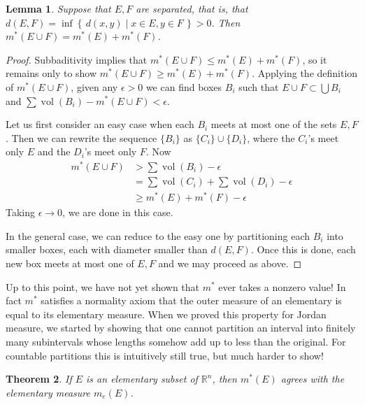 \documentclass[11pt,oneside]{amsbook}
\newcommand{\set}[1]{\left\{\,#1\,\right\}}
\newcommand{\RR}{{\mathbb R}}
\DeclareMathOperator{\vol}{vol}
\theoremstyle{definition}
\theoremstyle{plain}
\newtheorem{thm}{Theorem}[section]
\newtheorem{lem}[thm]{Lemma}
\theoremstyle{definition}
\theoremstyle{remark}
\numberwithin{equation}{section}
\numberwithin{figure}{section}
\begin{document}
\begin{lem}
  Suppose that $E,F$ are separated, that is, that $d(E,F)=\inf\set{d(x,y)\mid x\in E, y\in F}>0$. Then $m^*(E\cup F)=m^*(E)+m^*(F)$.
\end{lem}

\begin{proof}
  Subbaditivity implies that $m^*(E\cup F)\leq m^*(E)+m^*(F)$, so it remains only to show $m^*(E\cup F)\geq m^*(E)+m^*(F)$. Applying the definition of $m^*(E\cup F)$, given any $\epsilon>0$ we can find boxes $B_i$ such that $E\cup F\subset\bigcup B_i$ and $\sum\vol(B_i)-m^*(E\cup F)<\epsilon$.

  Let us first consider an easy case when each $B_i$ meets at most one of the sets $E,F$. Then we can rewrite the sequence $\{B_i\}$ as $\{C_i\}\cup\{D_i\}$, where the $C_i$'s meet only $E$ and the $D_i$'s meet only $F$. Now
  \begin{align*}
    m^*(E\cup F)&>\sum\vol(B_i)-\epsilon\\
                &=\sum\vol(C_i)+\sum\vol(D_i)-\epsilon\\
                &\geq m^*(E)+m^*(F)-\epsilon
  \end{align*}
  Taking $\epsilon\to0$, we are done in this case.

  In the general case, we can reduce to the easy one by partitioning each $B_i$ into smaller boxes, each with diameter smaller than $d(E,F)$. Once this is done, each new box meets at most one of $E,F$ and we may proceed as above.
\end{proof}

Up to this point, we have not yet shown that $m^*$ ever takes a nonzero value! In fact $m^*$ satisfies a normality axiom that the outer measure of an elementary is equal to its elementary measure. When we proved this property for Jordan measure, we started by showing that one cannot partition an interval into finitely many subintervals whose lengths somehow add up to less than the original. For countable partitions this is intuitively still true, but much harder to show!

\begin{thm}
  If $E$ is an elementary subset of $\RR^n$, then $m^*(E)$ agrees with the elementary measure $m_e(E)$.
\end{thm}
\end{document}
